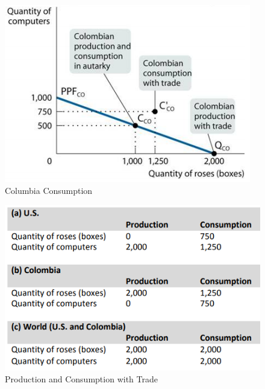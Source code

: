 \documentclass{article}
\begin{document}
\begin{figure}[H]
    \centering
    \includegraphics[scale=1]{"Figure 5b"}
    \caption{Columbia Consumption}
\end{figure}

\begin{figure}[H]
    \centering
    \includegraphics[scale=0.95]{"Figure 5c"}
    \caption{Production and Consumption with Trade}
\end{figure}
\end{document}

